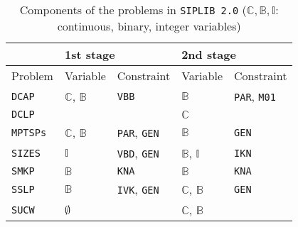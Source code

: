 \begin{table}[H]
	\centering
	\caption{Components of the problems in \texttt{SIPLIB 2.0} ($\mathbb{C},\mathbb{B},\mathbb{I}$: continuous, binary, integer variables)}
	\label{table:prob_class}
	\begin{tabular}{@{}lllll@{}}
		\toprule
		& \multicolumn{2}{l}{1st stage}                              				  	& \multicolumn{2}{l}{2nd stage}                             			        \\ \midrule
		Problem 	     & Variable                    & Constraint                   	& Variable                    & Constraint                  				    \\ \midrule
		\texttt{DCAP}    & $\mathbb{C}$, $\mathbb{B}$  & \texttt{VBB}                	& $\mathbb{B}$                & \texttt{PAR}, \texttt{M01} 			    		\\
		\texttt{DCLP}	 &							   &								& $\mathbb{C}$			 	  &													\\				
		\texttt{MPTSPs}  & $\mathbb{C}$, $\mathbb{B}$  & \texttt{PAR}, \texttt{GEN}		& $\mathbb{B}$                & \texttt{GEN}               						\\
		\texttt{SIZES}   & $\mathbb{I}$ 			   & \texttt{VBD}, \texttt{GEN} 	& $\mathbb{B}$, $\mathbb{I}$  & \texttt{IKN}             						\\
		\texttt{SMKP}    & $\mathbb{B}$                & \texttt{KNA}                	& $\mathbb{B}$                & \texttt{KNA}              						\\
		\texttt{SSLP}    & $\mathbb{B}$                & \texttt{IVK}, \texttt{GEN} 	& $\mathbb{C}$, $\mathbb{B}$  & \texttt{GEN}             						\\
		\texttt{SUCW}    & $\emptyset$                 &                              	& $\mathbb{C}$, $\mathbb{B}$  &                             					\\ \bottomrule
	\end{tabular}
\end{table}


